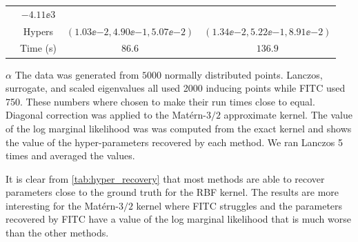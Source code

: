 \begin{table}[htp]
\begin{threeparttable}
\begin{tabular}{r| c c c}
      & $-4.11\ee{3}$ \\
      & Hypers & $(1.03\ee{-2},4.90\ee{-1},5.07\ee{-2})$ & $(1.34\ee{-2},5.22
      \ee{-1},8.91\ee{-2})$ \\
      & Time (s) & $86.6$ & $136.9$ \\
      \bottomrule
    \end{tabular}
    \begin{tablenotes}
      \item[$\alpha$]The data was generated from $5000$ normally distributed
      points. Lanczos, surrogate, and scaled eigenvalues all used 2000 inducing
      points while FITC used 750. These numbers where chosen to make their run
      times close to equal. Diagonal correction was applied to the 
      Mat\'ern\hyp{}$3/2$ approximate kernel. The value of the log marginal
      likelihood was was computed from the exact kernel and shows the value of
      the hyper\hyp{}parameters recovered by each method. We ran Lanczos 5 times
      and averaged the values.
    \end{tablenotes}
  \end{threeparttable}
\end{table}

It is clear from \cref{tab:hyper_recovery} that most methods are able to recover
parameters close to the ground truth for the RBF kernel. The results are more
interesting for the Mat\'ern\hyp{}$3/2$ kernel where FITC struggles and the
parameters recovered by FITC have a value of the log marginal likelihood that is
much worse than the other methods.